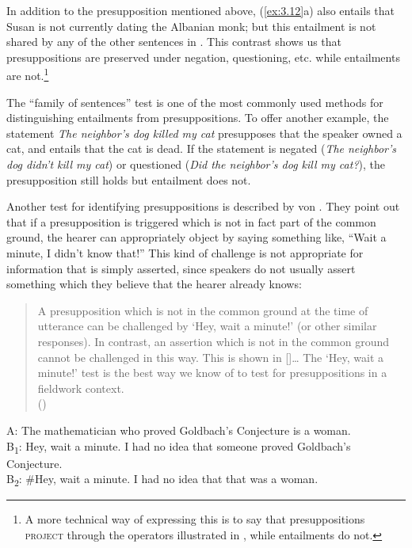 In addition to the presupposition mentioned above, (\ref{ex:3.12}a) also entails that Susan is not currently dating the Albanian monk; but this entailment is not shared by any of the other sentences in . This contrast shows us that presuppositions are preserved under negation, questioning, etc. while entailments are not.\footnote{A more technical way of expressing this is to say that presuppositions \textsc{project} through the operators illustrated in , while entailments do not.}



The “family of sentences” test is one of the most commonly used methods for distinguishing entailments from presuppositions. To offer another example, the statement \textit{The neighbor’s dog killed my cat} presupposes that the speaker owned a cat, and entails that the cat is dead. If the statement is negated (\textit{The neighbor’s dog didn’t kill my cat}) or questioned (\textit{Did the neighbor’s dog kill my cat?}), the presupposition still holds but entailment does not.



Another test for identifying presuppositions is described by von \citet{FintelMatthewson2008}. They point out that if a presupposition is triggered which is not in fact part of the common ground, the hearer can appropriately object by saying something like, “Wait a minute, I didn’t know that!” This kind of challenge is not appropriate for information that is simply asserted, since speakers do not usually assert something which they believe that the hearer already knows:


\begin{quote}
A presupposition which is not in the common ground at the time of utterance can be challenged by ‘Hey, wait a minute!’ (or other similar responses). In contrast, an assertion which is not in the common ground cannot be challenged in this way. This is shown in []… The ‘Hey, wait a minute!’ test is the best way we know of to test for presuppositions in a fieldwork context.\\
   (\citealt{vonFintelMatthewson2008})
\end{quote}

\ea \label{ex:3.13}
A: The mathematician who proved Goldbach’s Conjecture is a woman.\\
B\textsubscript{1}: Hey, wait a minute. I had no idea that someone proved Goldbach’s Conjecture.\\
B\textsubscript{2}: \#Hey, wait a minute. I had no idea that that was a woman.
\z


